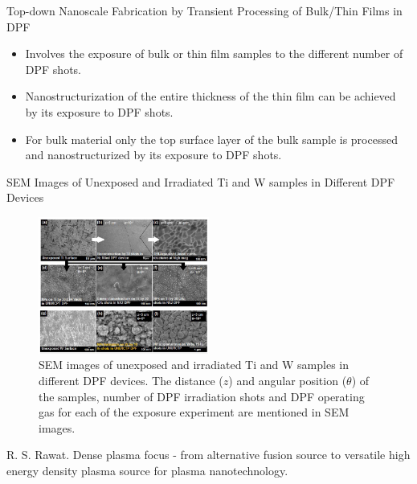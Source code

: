 \begin{frame} {Top-down Nanoscale Fabrication by Transient Processing of Bulk/Thin Films in DPF}
    \begin{itemize}
        \item Involves the exposure of bulk or thin film samples to the different number of DPF shots.
        \item Nanostructurization of the entire thickness of the thin film can be achieved by its exposure to DPF shots.
        \item For bulk material only the top surface layer of the bulk sample is processed and nanostructurized by its exposure to DPF shots.
    \end{itemize}
\end{frame}

\begin{frame} {SEM Images of Unexposed and Irradiated Ti and W samples in Different DPF Devices}
    \begin{figure}
        \centering
        \includegraphics[width=0.5\textwidth]{figures/irradiated-ti-and-w-samples.png}
        \caption{\scriptsize SEM images of unexposed and irradiated Ti and W samples in different DPF devices. The distance ($z$) and angular position ($\theta$) of the samples, number of DPF irradiation shots and DPF operating gas for each of the exposure experiment are mentioned in SEM images. \cite{rawat_2015_dense}}
        \label{fig:irradiated-ti-and-w-samples}
    \end{figure}
    \tiny{\cite{rawat_2015_dense} R. S. Rawat. Dense plasma focus - from alternative fusion source to versatile high energy density plasma source for plasma nanotechnology.}
\end{frame}


